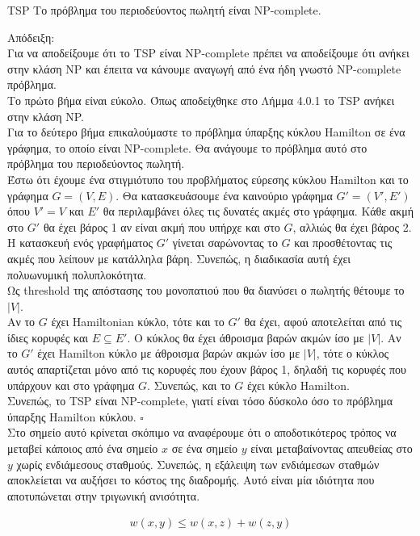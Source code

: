 \documentclass[oneside,12pt]{book}
\theoremstyle{definition}
\begin{document}
\begin{mylemma}{TSP}{}
	Tο πρόβλημα του περιοδεύοντος πωλητή είναι NP-complete.	
\end{mylemma}

Απόδειξη: \\
Για να αποδείξουμε ότι το TSP είναι NP-complete πρέπει να αποδείξουμε ότι ανήκει στην κλάση NP και έπειτα να κάνουμε αναγωγή από ένα ήδη γνωστό NP-complete πρόβλημα. \\
Το πρώτο βήμα είναι εύκολο. Όπως αποδείχθηκε στο Λήμμα 4.0.1 το TSP ανήκει στην κλάση NP. \\
Για το δεύτερο βήμα επικαλούμαστε το πρόβλημα ύπαρξης κύκλου Hamilton σε ένα γράφημα, το οποίο είναι NP-complete. Θα ανάγουμε το πρόβλημα αυτό στο πρόβλημα του περιοδεύοντος πωλητή. \\
Έστω ότι έχουμε ένα στιγμιότυπο του προβλήματος εύρεσης κύκλου Hamilton και το γράφημα \(G = (V,E)\). Θα κατασκευάσουμε ένα καινούριο γράφημα \(G' = (V',E')\) όπου \(V' = V\) και \(E'\) θα περιλαμβάνει όλες τις δυνατές ακμές στο γράφημα. Κάθε ακμή στο \(G'\) θα έχει βάρος 1 αν είναι ακμή που υπήρχε και στο \(G\), αλλιώς θα έχει βάρος 2. Η κατασκευή ενός γραφήματος \(G'\) γίνεται σαρώνοντας το \(G\) και προσθέτοντας τις ακμές που λείπουν με κατάλληλα βάρη. Συνεπώς, η διαδικασία αυτή έχει πολυωνυμική πολυπλοκότητα. \\
Ως threshold της απόστασης του μονοπατιού που θα διανύσει ο πωλητής θέτουμε το \(|V|\). \\
Αν το \(G\) έχει Hamiltonian κύκλο, τότε και το \(G'\) θα έχει, αφού αποτελείται από τις ίδιες κορυφές και \(Ε \subseteq E'\). Ο κύκλος θα έχει άθροισμα βαρών ακμών ίσο με \(|V|\).
Αν το \(G'\) έχει Hamilton κύκλο με άθροισμα βαρών ακμών ίσο με \(|V|\), τότε ο κύκλος αυτός απαρτίζεται μόνο από τις κορυφές που έχουν βάρος 1, δηλαδή τις κορυφές που υπάρχουν και στο γράφημα \(G\). Συνεπώς, και το \(G\) έχει κύκλο Hamilton. \\
Συνεπώς, το TSP είναι NP-complete, γιατί είναι τόσο δύσκολο όσο το πρόβλημα ύπαρξης Hamilton κύκλου. \(\square\) \\

Στο σημείο αυτό κρίνεται σκόπιμο να αναφέρουμε ότι ο αποδοτικότερος τρόπος να μεταβεί κάποιος από ένα σημείο \(x\) σε ένα σημείο \(y\) είναι μεταβαίνοντας απευθείας στο \(y\) χωρίς ενδιάμεσους σταθμούς. Συνεπώς, η εξάλειψη των ενδιάμεσων σταθμών αποκλείεται να αυξήσει το κόστος της διαδρομής. Αυτό είναι μία ιδιότητα που αποτυπώνεται στην τριγωνική ανισότητα. 

\begin{align*}
	w(x,y) \leq w(x,z) + w(z,y)
\end{align*}
\end{document}

